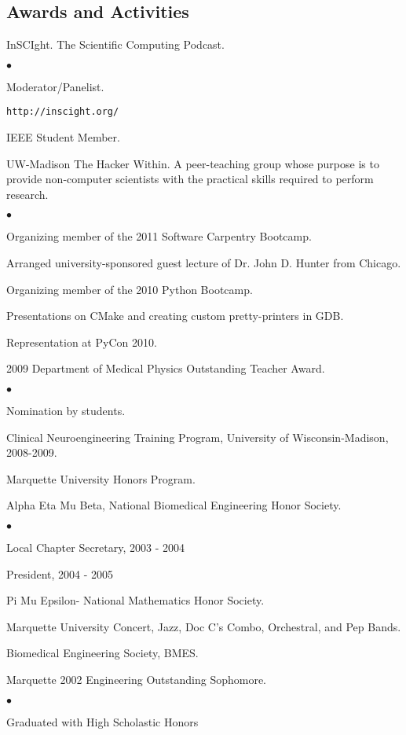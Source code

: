 \documentclass[margin,line]{res}
\newenvironment{list2}{
  \begin{list}{$\bullet$}{%
      \setlength{\itemsep}{0in}
      \setlength{\parsep}{0in} \setlength{\parskip}{0in}
      \setlength{\topsep}{0in} \setlength{\partopsep}{0in} 
      \setlength{\leftmargin}{0.2in}}}{\end{list}}
\begin{document}
\begin{resume}
\section{\sc Awards and Activities}
InSCIght.  The Scientific Computing Podcast.
\begin{list2}
\item Moderator/Panelist.
\item \verb#http://inscight.org/#
\end{list2}

IEEE Student Member.

UW-Madison The Hacker Within.  A peer-teaching group whose purpose is to provide
non-computer scientists with the practical skills required to perform research.
\begin{list2}
\item Organizing member of the 2011 Software Carpentry Bootcamp.
\item Arranged university-sponsored guest lecture of Dr. John D. Hunter from Chicago.
\item Organizing member of the 2010 Python Bootcamp.
\item Presentations on CMake and creating custom pretty-printers in GDB.
\item Representation at PyCon 2010.
\end{list2}

2009 Department of Medical Physics Outstanding Teacher Award.
\begin{list2}
\item  Nomination by students.
\end{list2}

Clinical Neuroengineering Training Program, University of Wisconsin-Madison,
2008-2009.

Marquette University Honors Program.

Alpha Eta Mu Beta, National Biomedical Engineering Honor Society.
\begin{list2}
 \item Local Chapter Secretary, 2003 - 2004
 \item President, 2004 - 2005
\end{list2}

Pi Mu Epsilon- National Mathematics Honor Society.

Marquette University Concert, Jazz, Doc C's Combo, Orchestral, and Pep Bands.

Biomedical Engineering Society, BMES.

Marquette 2002 Engineering Outstanding Sophomore.
\begin{list2}
\item Graduated with High Scholastic Honors
\end{list2}


\end{resume}
\end{document}
